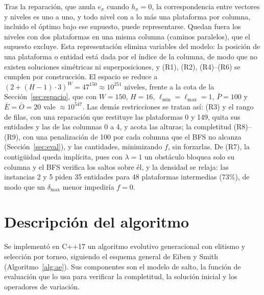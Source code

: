 \documentclass[letter, 10pt]{article}
\begin{document}
Tras la reparaci\'on, que anula $e_x$ cuando $h_x=0$, la correspondencia entre vectores y niveles es uno a uno, y todo nivel con a lo m\'as una plataforma por columna, incluido el \'optimo bajo ese supuesto, puede representarse. Quedan fuera los niveles con dos plataformas en una misma columna (caminos paralelos), que el supuesto excluye. Esta representaci\'on elimina variables del modelo: la posici\'on de una plataforma o entidad est\'a dada por el \'indice de la columna, de modo que no existen soluciones sim\'etricas ni superposiciones, y (R1), (R2), (R4)--(R6) se cumplen por construcci\'on. El espacio se reduce a $(2+(H-1)\cdot3)^{W}=47^{150}\approx10^{251}$ niveles, frente a la cota de la Secci\'on~\ref{sec:espacio}, que con $W=150$, $H=16$, $\ell_{\min}=\ell_{\max}=1$, $\bar P=100$ y $\bar E=\bar O=20$ vale $\approx10^{547}$. Las dem\'as restricciones se tratan as\'i: (R3) y el rango de filas, con una reparaci\'on que restituye las plataformas 0 y 149, quita sus entidades y las de las columnas 0 a 4, y acota las alturas; la completitud (R8)--(R9), con una penalizaci\'on de 100 por cada columna que el BFS no alcanza (Secci\'on~\ref{sec:eval}), y las cantidades, minimizando $f$, sin forzarlas. De (R7), la contig\"uidad queda impl\'icita, pues con $\lambda=1$ un obst\'aculo bloquea solo su columna y el BFS verifica los saltos sobre \'el, y la densidad se relaja: las instancias 2 y 5 piden 35 entidades para 48 plataformas intermedias (73\%), de modo que un $\delta_{\max}$ menor impedir\'ia $f=0$.

\section{Descripci\'on del algoritmo}\label{sec:alg}
Se implement\'o en C++17 un algoritmo evolutivo generacional con elitismo y selecci\'on por torneo, siguiendo el esquema general de Eiben y Smith~\cite{Eiben2015} (Algoritmo~\ref{alg:ae}). Sus componentes son el modelo de salto, la funci\'on de evaluaci\'on que lo usa para verificar la completitud, la soluci\'on inicial y los operadores de variaci\'on.
\end{document}
